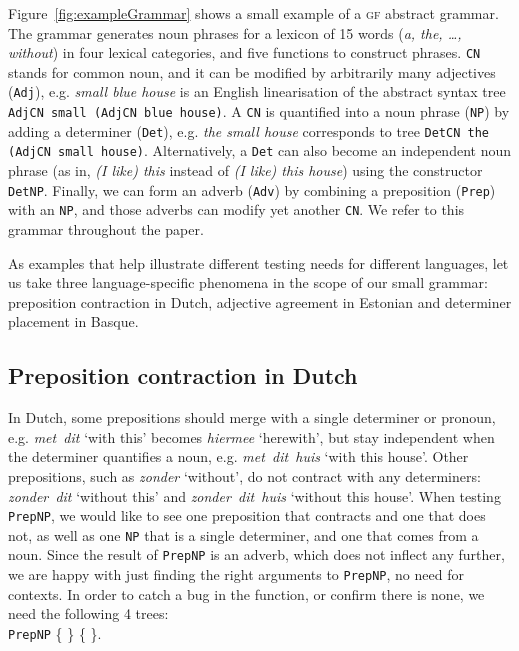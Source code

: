 \documentclass[11pt]{article}
\def\t#1{\texttt{#1}}
\def\gf{\textsc{gf}}
\begin{document}
Figure~\ref{fig:exampleGrammar} shows a small example of a \gf{} abstract
grammar. The grammar generates noun phrases for a lexicon of 15
words (\emph{a, the, \dots, without}) in four lexical categories,
and five functions to construct phrases. \t{CN} stands for common
noun, and it can be modified by arbitrarily many adjectives (\t{Adj}),
e.g. \emph{small blue house} is an English linearisation of the
abstract syntax tree \t{AdjCN small (AdjCN blue house)}. A \t{CN} is
quantified into a noun phrase (\t{NP}) by adding a determiner
(\t{Det}), e.g. \emph{the small house} corresponds to tree \t{DetCN the (AdjCN small
  house)}. Alternatively, a \t{Det} can also become an independent
noun phrase (as in, \emph{(I like) this} instead of \emph{(I like) this
  house}) using the constructor \t{DetNP}. Finally, we can form an
adverb (\t{Adv}) by combining a preposition (\t{Prep}) with an \t{NP},
and those adverbs can modify yet another \t{CN}. 
We refer to this grammar throughout the paper.

As examples that help illustrate different testing needs for different languages, let us take three language-specific phenomena in the scope of our
small grammar: preposition contraction in Dutch, adjective agreement
in Estonian and determiner placement in Basque.

\subsection{Preposition contraction in Dutch} In Dutch, some prepositions should
merge with a single determiner or pronoun, e.g. \emph{met~dit} `with
this' becomes \emph{hiermee} `herewith', but stay independent when the
determiner quantifies a noun, e.g. \emph{met~dit~huis} `with this house'. 
Other prepositions, such as \emph{zonder} `without', do not
contract with any determiners: \emph{zonder~dit} `without this' and
\emph{zonder~dit~huis} `without this house'.
When testing \t{PrepNP}, we would like to see one preposition that
contracts and one that does not, as well as one \t{NP} that is a
single determiner, and one that comes from a noun. Since the result of
\t{PrepNP} is an adverb, which does not inflect any further, we are
happy with just finding the right arguments to \t{PrepNP}, no need for contexts.
In order to catch a bug in the function, or confirm there is none, we
need the following 4 trees: \\
\t{PrepNP} \{  \} 
           \{  \}. 
\end{document}
